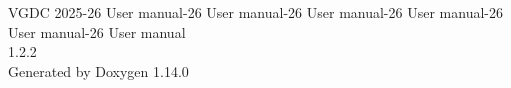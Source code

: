 \documentclass[twoside]{book}
\newcommand{\+}{\discretionary{\mbox{\scriptsize$\hookleftarrow$}}{}{}}
\newcommand{\clearemptydoublepage}{%
    \newpage{\pagestyle{empty}\cleardoublepage}%
  }
\begin{document}
  \raggedbottom
    \hypersetup{pageanchor=false,
                bookmarksnumbered=true,
                pdfencoding=unicode
               }
  \begin{titlepage}
  \vspace*{7cm}
  \begin{center}%
  {\Large VGDC 2025-\/26 User manual-\/26 User manual-\/26 User manual-\/26 User manual-\/26 User manual-\/26 User manual}\\
  [1ex]\large 1.\+2.\+2 \\
  \vspace*{1cm}
  {\large Generated by Doxygen 1.14.0}\\
  \end{center}
  \end{titlepage}
  \clearemptydoublepage
  \tableofcontents
  \clearemptydoublepage
  \hypersetup{pageanchor=true}
  \backmatter
  \newpage
  \clearemptydoublepage
  \printindex
\end{document}
